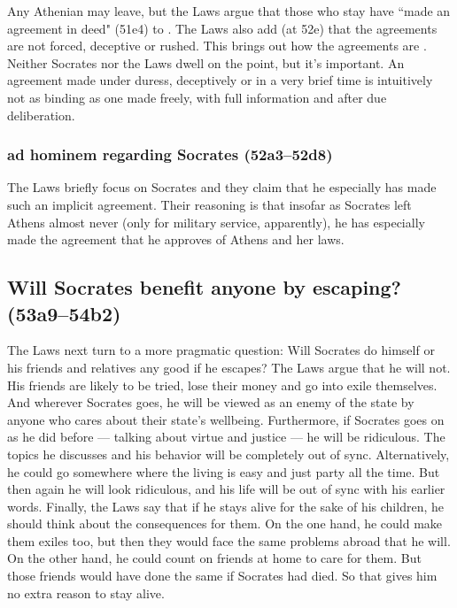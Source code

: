\documentclass[11pt]{article}
\begin{document}
Any Athenian may leave, but the Laws argue that those who stay have ``made an agreement in deed" (51e4) to .  The Laws also add (at 52e) that the agreements are not forced, deceptive or rushed.  This brings out how the agreements are .  Neither Socrates nor the Laws dwell on the point, but it's important.  An agreement made under duress, deceptively or in a very brief time is intuitively not as binding as one made freely, with full information and after due deliberation.


\subsubsection{ad hominem regarding Socrates (52a3--52d8)}

The Laws briefly focus on Socrates and they claim that he especially has made such an implicit agreement.  Their reasoning is that insofar as Socrates left Athens almost never (only for military service, apparently), he has especially made the  agreement that he approves of Athens and her laws.

\subsection{Will Socrates benefit anyone by escaping? (53a9--54b2)}

The Laws next turn to a more pragmatic question: Will Socrates do himself or his friends and relatives any good if he escapes?  The Laws argue that he will not.  His friends are likely to be tried, lose their money and go into exile themselves.  And wherever Socrates goes, he will be viewed as an enemy of the state by anyone who cares about their state's wellbeing.  Furthermore, if Socrates goes on as he did before --- talking about virtue and justice --- he will be ridiculous.  The topics he discusses and his behavior will be completely out of sync.  Alternatively, he could go somewhere where the living is easy and just party all the time.  But then again he will look ridiculous, and his life will be out of sync with his earlier words.  Finally, the Laws say that if he stays alive for the sake of his children, he should think about the consequences for them.  On the one hand, he could make them exiles too, but then they would face the same problems abroad that he will.  On the other hand, he could count on friends at home to care for them.  But those friends would have done the same if Socrates had died.  So that gives him no extra reason to stay alive.
\end{document}
